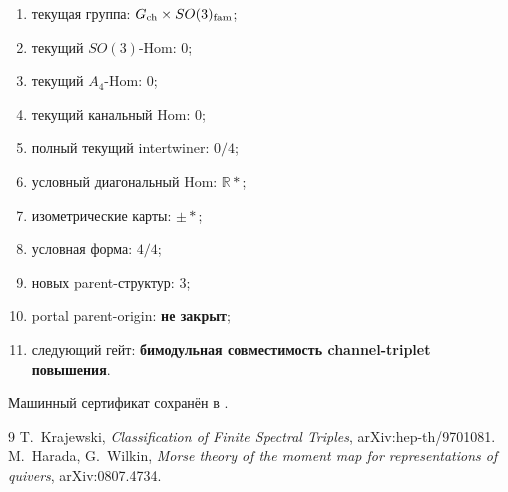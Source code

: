 \begin{protocol}\begin{enumerate}
\item текущая группа: \textbf{$G_{\rm ch}\times SO(3)_{\rm fam}$};
\item текущий $SO(3)$-Hom: \textbf{$0$};
\item текущий $A_4$-Hom: \textbf{$0$};
\item текущий канальный Hom: \textbf{$0$};
\item полный текущий intertwiner: \textbf{$0/4$};
\item условный диагональный Hom: \textbf{$\mathbb R*$};
\item изометрические карты: \textbf{$\pm *$};
\item условная форма: \textbf{$4/4$};
\item новых parent-структур: \textbf{$3$};
\item portal parent-origin: \textbf{не закрыт};
\item следующий гейт: \textbf{бимодульная совместимость channel-triplet повышения}.
\end{enumerate}\end{protocol}

Машинный сертификат сохранён в
.

\begin{thebibliography}{9}
T.~Krajewski,
\emph{Classification of Finite Spectral Triples},
arXiv:hep-th/9701081.
M.~Harada, G.~Wilkin,
\emph{Morse theory of the moment map for representations of quivers},
arXiv:0807.4734.
\end{thebibliography}